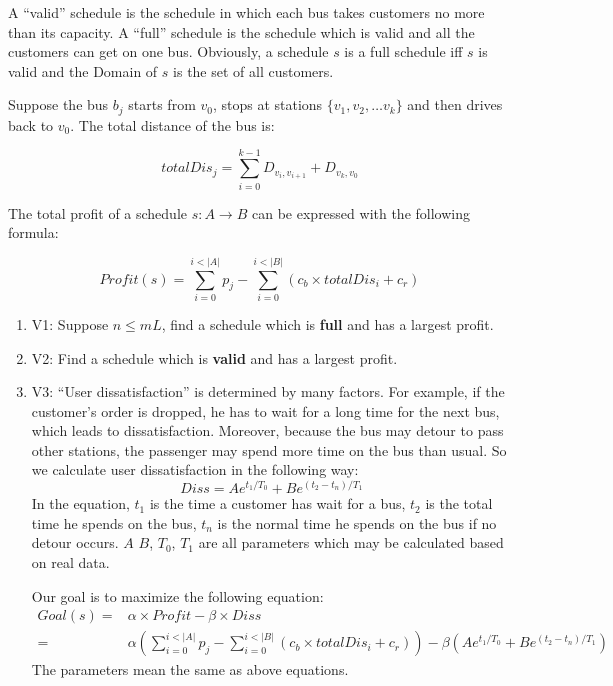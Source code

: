 \documentclass{llncs}
\begin{document}
A ``valid'' schedule is the schedule in which each bus takes customers no more than its capacity. A ``full'' schedule is the schedule which is valid and all the customers can get on one bus. Obviously, a schedule $s$ is a full schedule iff $s$ is valid and the Domain of $s$ is the set of all customers.

Suppose the bus $b_j$ starts from $v_0$, stops at stations $\{v_1, v_2, \dots v_k\}$ and then drives back to $v_0$. The total distance of the bus is: 

\begin{equation}
totalDis_j = \sum_{i = 0}^{k-1}{D_{v_i, v_{i+1}}} + D_{v_k, v_0}
\end{equation}

The total profit of a schedule $s: A \rightarrow B$ can be expressed with the following formula:

\begin{equation}
Profit(s) = \sum_{i = 0}^{i<|A|}{p_j} - \sum_{i=0}^{i<|B|}{(c_b \times totalDis_i +c_r)}
\end{equation}

\begin{enumerate}
\item V1: Suppose $n \leq mL$, find a schedule which is \textbf{full} and has a largest profit.
\item V2: Find a schedule which is \textbf{valid} and has a largest profit.
\item V3: ``User dissatisfaction'' is determined by many factors. For example, if the customer's order is dropped, he has to wait for a long time for the next bus, which leads to dissatisfaction. Moreover, because the bus may detour to pass other stations, the passenger may spend more time on the bus than usual. So we calculate user dissatisfaction in the following way:
	\begin{equation}
	Diss = A e^{t_1/T_0} + B e^{(t_2 - t_n)/T_1}
	\end{equation}
In the equation, $t_1$ is the time a customer has wait for a bus, $t_2$ is the total time he spends on the bus, $t_n$ is the normal time he spends on the bus if no detour occurs. $A$ $B$, $T_0$, $T_1$ are all parameters which may be calculated based on real data.

Our goal is to maximize the following equation:
\begin{align*}
Goal(s) =& \alpha \times Profit - \beta \times Diss \\
	 =& \alpha (\sum_{i = 0}^{i<|A|}{p_j} - \sum_{i=0}^{i<|B|}{(c_b \times totalDis_i +c_r)}) - \beta(A e^{t_1/T_0} + B e^{(t_2 - t_n)/T_1})
\end{align*}
The parameters mean the same as above equations.
\end{enumerate}
\end{document}
